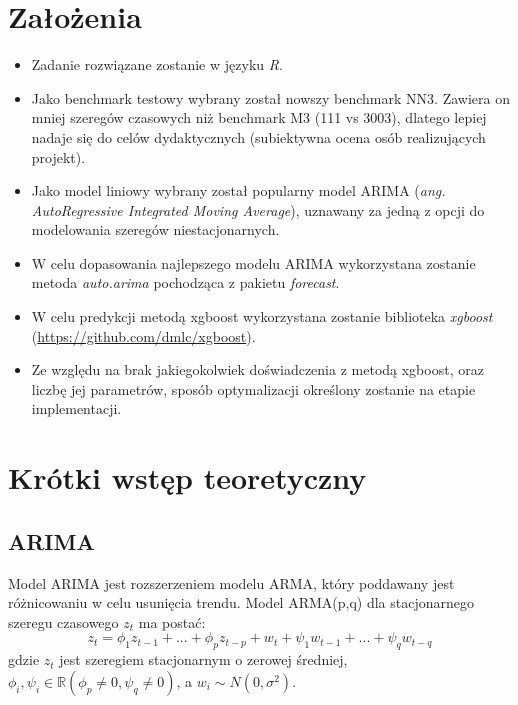 \documentclass[11pt]{report}
\begin{document}
\section{Założenia}
\begin{itemize}
\item Zadanie rozwiązane zostanie w języku \textit{R}.

\item Jako benchmark testowy wybrany został nowszy benchmark NN3.
Zawiera on mniej szeregów czasowych niż benchmark M3 (111 vs 3003), dlatego lepiej nadaje się do celów dydaktycznych (subiektywna ocena osób realizujących projekt).

\item Jako model liniowy wybrany został popularny model ARIMA (\textit{ang. AutoRegressive Integrated Moving Average}), uznawany za jedną z opcji do modelowania szeregów niestacjonarnych.

\item W celu dopasowania najlepszego modelu ARIMA wykorzystana zostanie metoda \textit{auto.arima} pochodząca z pakietu \textit{forecast}.

\item W celu predykcji metodą xgboost wykorzystana zostanie biblioteka \textit{xgboost} (\url{https://github.com/dmlc/xgboost}).

\item Ze względu na brak jakiegokolwiek doświadczenia z metodą xgboost, oraz liczbę jej parametrów, sposób optymalizacji określony zostanie na etapie implementacji.
\end{itemize}

\section{Krótki wstęp teoretyczny}

\subsection{ARIMA}
Model ARIMA jest rozszerzeniem modelu ARMA, który poddawany jest różnicowaniu w celu usunięcia trendu.
Model ARMA(p,q) dla stacjonarnego szeregu czasowego $z_t$ ma postać:
\begin{equation}
    z_t = \phi_1 z_{t-1} + ... + \phi_p z_{t-p} + w_t + \psi_1 w_{t-1} + ... + \psi_q w_{t-q}
\end{equation}
gdzie $z_t$ jest szeregiem stacjonarnym o zerowej średniej, $\phi_i,\psi_i \in \mathbb{R} (\phi_p \neq 0, \psi_q \neq 0)$, a $w_i \sim N(0, \sigma^2)$.
\end{document}
